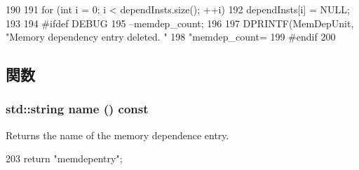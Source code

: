 \begin{DoxyCode}
190         {
191             for (int i = 0; i < dependInsts.size(); ++i) {
192                 dependInsts[i] = NULL;
193             }
194 #ifdef DEBUG
195             --memdep_count;
196 
197             DPRINTF(MemDepUnit, "Memory dependency entry deleted.  "
198                     "memdep_count=%
199 #endif
200         }
\end{DoxyCode}


\subsection{関数}
\hypertarget{classMemDepUnit_1_1MemDepEntry_a37627d5d5bba7f4a8690c71c2ab3cb07}{
\subsubsection[{name}]{\setlength{\rightskip}{0pt plus 5cm}std::string name () const}}
\label{classMemDepUnit_1_1MemDepEntry_a37627d5d5bba7f4a8690c71c2ab3cb07}
Returns the name of the memory dependence entry. 


\begin{DoxyCode}
203 { return "memdepentry"; }
\end{DoxyCode}


